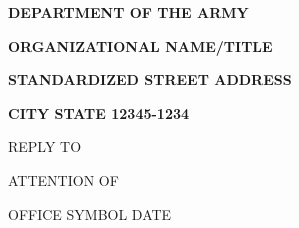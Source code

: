 \documentclass[12pt,letterpaper,oneside]{report}
\begin{document}
\thispagestyle{empty}


{\footnotesize \centerline{\textbf{DEPARTMENT OF THE ARMY}}}
{\scriptsize \centerline{\textbf{ORGANIZATIONAL NAME/TITLE}}}
{\scriptsize \centerline{\textbf{STANDARDIZED STREET ADDRESS}}}
{\scriptsize \centerline{\textbf{CITY STATE 12345-1234}}}

{}

\setlength{\parindent}{14.82mm}
\setlength{\parskip}{-8pt}
{\tiny REPLY TO}

\setlength{\parindent}{14.82mm}
\setlength{\parskip}{-8pt}
{\tiny ATTENTION OF}

\setlength{\parskip}{12pt}
\noindent
OFFICE SYMBOL \hfill DATE
\end{document}
